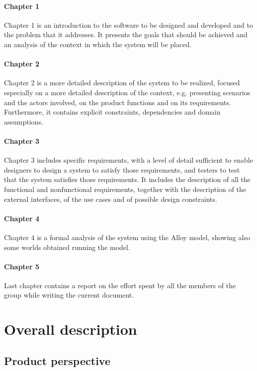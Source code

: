\documentclass[a4paper,oneside,11pt]{book}   %
\begin{document}
    \subsubsection{Chapter 1} 
    Chapter 1 is an introduction to the software to be designed and developed and to the problem that it addresses. It presents the goals that should be achieved and an analysis of the context in which the system will be placed.
    \subsubsection{Chapter 2} 
    Chapter 2 is a more detailed description of the system to be realized, focused especially on a more detailed description of the context, e.g. presenting scenarios and the actors involved, on the product functions and on its requirements. Furthermore, it contains explicit constraints, dependencies and domain assumptions.
    \subsubsection{Chapter 3} Chapter 3 includes specific requirements, with a level of detail sufficient to enable designers to design a system to satisfy those requirements, and testers to test that the system satisfies those requirements. It includes the description of all the functional and nonfunctional requirements, together with the description of the external interfaces, of the use cases and of possible design constraints.
    \subsubsection{Chapter 4} 
    Chapter 4 is a formal analysis of the system using the Alloy model, showing also some worlds obtained running the model.
    \subsubsection{Chapter 5}
    Last chapter contains a report on the effort spent by all the members of the group while writing the current document.

\chapter{Overall description}
    \section{Product perspective}
\end{document}
